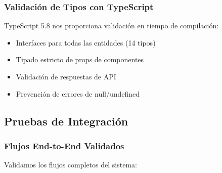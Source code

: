 \subsubsection{Validación de Tipos con TypeScript}

TypeScript 5.8 nos proporciona validación en tiempo de compilación:

\begin{itemize}
    \item Interfaces para todas las entidades (14 tipos)
    \item Tipado estricto de props de componentes
    \item Validación de respuestas de API
    \item Prevención de errores de null/undefined
\end{itemize}

\subsection{Pruebas de Integración}

\subsubsection{Flujos End-to-End Validados}

Validamos los flujos completos del sistema:

